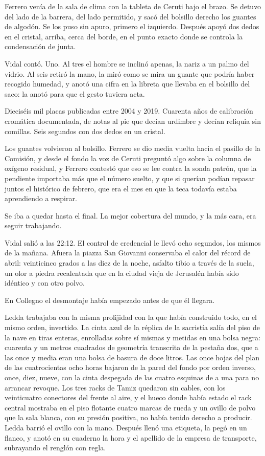 Ferrero venía de la sala de clima con la tableta de Ceruti bajo el brazo. Se detuvo del lado de la barrera, del lado permitido, y sacó del bolsillo derecho los guantes de algodón. Se los puso sin apuro, primero el izquierdo. Después apoyó dos dedos en el cristal, arriba, cerca del borde, en el punto exacto donde se controla la condensación de junta.

Vidal contó. Uno. Al tres el hombre se inclinó apenas, la nariz a un palmo del vidrio. Al seis retiró la mano, la miró como se mira un guante que podría haber recogido humedad, y anotó una cifra en la libreta que llevaba en el bolsillo del saco: la anotó para que el gesto tuviera acta.

Dieciséis mil placas publicadas entre 2004 y 2019. Cuarenta años de calibración cromática documentada, de notas al pie que decían urdimbre y decían reliquia sin comillas. Seis segundos con dos dedos en un cristal.

Los guantes volvieron al bolsillo. Ferrero se dio media vuelta hacia el pasillo de la Comisión, y desde el fondo la voz de Ceruti preguntó algo sobre la columna de oxígeno residual, y Ferrero contestó que eso se lee contra la sonda patrón, que la pendiente importaba más que el número suelto, y que si querían podían repasar juntos el histórico de febrero, que era el mes en que la teca todavía estaba aprendiendo a respirar.

Se iba a quedar hasta el final. La mejor cobertura del mundo, y la más cara, era seguir trabajando.

Vidal salió a las 22:12. El control de credencial le llevó ocho segundos, los mismos de la mañana. Afuera la piazza San Giovanni conservaba el calor del récord de abril: veinticinco grados a las diez de la noche, asfalto tibio a través de la suela, un olor a piedra recalentada que en la ciudad vieja de Jerusalén había sido idéntico y con otro polvo.


\scenebreak


En Collegno el desmontaje había empezado antes de que él llegara.

Ledda trabajaba con la misma prolijidad con la que había construido todo, en el mismo orden, invertido. La cinta azul de la réplica de la sacristía salía del piso de la nave en tiras enteras, enrolladas sobre sí mismas y metidas en una bolsa negra: cuarenta y un metros cuadrados de geometría transcrita de la pestaña dos, que a las once y media eran una bolsa de basura de doce litros. Las once hojas del plan de las cuatrocientas ocho horas bajaron de la pared del fondo por orden inverso, once, diez, nueve, con la cinta despegada de las cuatro esquinas de a una para no arrancar revoque. Los tres racks de Tamiz quedaron sin cables, con los veinticuatro conectores del frente al aire, y el hueco donde había estado el rack central mostraba en el piso flotante cuatro marcas de rueda y un ovillo de polvo que la sala blanca, con su presión positiva, no había tenido derecho a producir. Ledda barrió el ovillo con la mano. Después llenó una etiqueta, la pegó en un flanco, y anotó en su cuaderno la hora y el apellido de la empresa de transporte, subrayando el renglón con regla.


